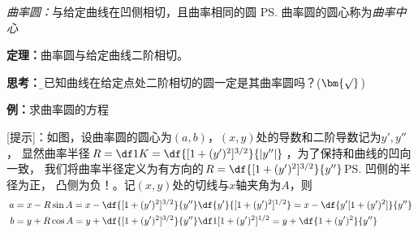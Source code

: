 {\it 曲率圆：}与给定曲线在凹侧相切，且曲率相同的圆
\ps{曲率圆的圆心称为{\it 曲率中心}}

{\bf 定理：}曲率圆与给定曲线二阶相切。

{\bf 思考：}{\b 与已知曲线在给定点处二阶相切的圆一定是其曲率圆吗？(${\bm{\surd}}$)}

{\bf 例：}求曲率圆的方程

\begin{center}
\end{center}

[提示]：如图，设曲率圆的圆心为$(a,b)$，$(x,y)$处的导数和二阶导数记为$y',y''$，
显然曲率半径$R=\df1K=\df{[1+(y')^2]^{3/2}}{|y''|}$，为了保持和曲线的凹向一致，
我们将曲率半径定义为有方向的$R=\df{[1+(y')^2]^{3/2}}{y''}$\ps{凹侧的半径为正，
凸侧为负！}。记$(x,y)$处的切线与$x$轴夹角为$A$，则
\begin{align}
	a&=x-R\sin A=x-\df{[1+(y')^2]^{3/2}}{y''}\df{y'}{[1+(y')^2]^{1/2}}
	=x-\df{y'[1+(y')^2]}{y''}\notag\\
	b&=y+R\cos A=y+\df{[1+(y')^2]^{3/2}}{y''}\df1{[1+(y')^2]^{1/2}}
	=y+\df{1+(y')^2}{y''}\notag
\end{align}

\begin{center}
\end{center}

